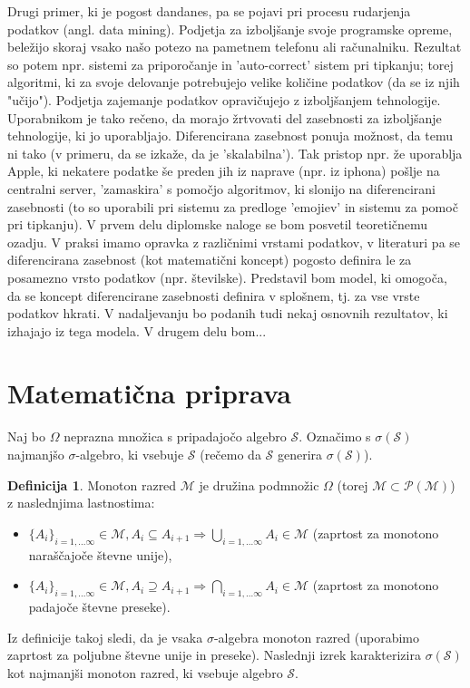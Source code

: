 \documentclass[12pt,a4paper]{amsart}
\theoremstyle{definition} %
\newtheorem{definicija}{Definicija}[section]
\theoremstyle{plain} %
\begin{document}
\newline
\newline
Drugi primer, ki je pogost dandanes, pa se pojavi pri procesu rudarjenja podatkov (angl. data mining). Podjetja za izboljšanje svoje programske opreme, beležijo skoraj vsako našo potezo na pametnem telefonu ali računalniku. Rezultat so potem npr. sistemi za priporočanje in 'auto-correct' sistem pri tipkanju; torej algoritmi, ki za svoje delovanje potrebujejo velike količine podatkov (da se iz njih "učijo"). Podjetja zajemanje podatkov opravičujejo z izboljšanjem tehnologije. Uporabnikom je tako rečeno, da morajo žrtvovati del zasebnosti za izboljšanje tehnologije, ki jo uporabljajo. Diferencirana zasebnost ponuja možnost, da temu ni tako (v primeru, da se izkaže, da je 'skalabilna'). Tak pristop npr. že uporablja Apple, ki nekatere podatke še preden jih iz naprave (npr. iz iphona) pošlje na centralni server, 'zamaskira' s pomočjo algoritmov, ki slonijo na diferencirani zasebnosti (to so uporabili pri sistemu za predloge 'emojiev' in sistemu za pomoč pri tipkanju). 
\newline
\newline
V prvem delu diplomske naloge se bom posvetil teoretičnemu ozadju. V praksi imamo opravka z različnimi vrstami podatkov, v literaturi pa se diferencirana zasebnost (kot matematični koncept) pogosto definira le za posamezno vrsto podatkov (npr. številske). Predstavil bom model, ki omogoča, da se koncept diferencirane zasebnosti definira v splošnem, tj. za vse vrste podatkov hkrati. V nadaljevanju bo podanih tudi nekaj osnovnih rezultatov, ki izhajajo iz tega modela. V drugem delu bom...

\section{Matematična priprava}

Naj bo $\Omega$ neprazna množica s pripadajočo algebro $\mathcal{S}$. Označimo s $\sigma(\mathcal{S})$ najmanjšo $\sigma$-algebro, ki vsebuje $\mathcal{S}$ (rečemo da $\mathcal{S}$ generira $\sigma(\mathcal{S})$).
\begin{definicija}
Monoton razred $\mathcal{M}$ je družina podmnožic $\Omega$ (torej $\mathcal{M} \subset \mathcal{P(\mathcal{M})}$) z naslednjima lastnostima:
\begin{itemize}
\item  $\{A_i\}_{i=1,...\infty} \in \mathcal{M}, A_i \subseteq A_{i+1} \Rightarrow \bigcup_{i=1,...\infty} A_i \in \mathcal{M}$ (zaprtost za monotono naraščajoče števne unije),
\item  $\{A_i\}_{i=1,...\infty} \in \mathcal{M}, A_i \supseteq A_{i+1} \Rightarrow \bigcap_{i=1,...\infty} A_i \in \mathcal{M}$ (zaprtost za monotono padajoče števne preseke).
\end{itemize}
\end{definicija}
Iz definicije takoj sledi, da je vsaka $\sigma$-algebra monoton razred (uporabimo zaprtost za poljubne števne unije in preseke). Naslednji izrek karakterizira $\sigma(\mathcal{S})$ kot najmanjši monoton razred, ki vsebuje algebro $\mathcal{S}$.
\end{document}
